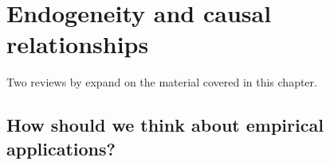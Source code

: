 

\section{Endogeneity and causal relationships}
\label{ch_causality}
Two reviews by \citet{IW07,IW09} expand on the material covered in
this chapter.
\subsection{How should we think about empirical applications?}

